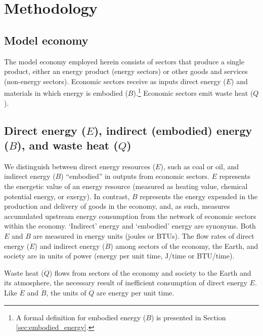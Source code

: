 \documentclass[authoryear,preprint,review,12pt]{elsarticle}
\begin{document}
\section{Methodology}

\subsection{Model economy}

The model economy employed herein consists of sectors that produce a single product, either an energy product (energy sectors) or other goods and services (non-energy sectors). Economic sectors receive as inputs direct energy ($E$) and materials in which energy is embodied ($B$).\footnote{A formal definition for embodied energy ($B$) is presented in Section \ref{sec:embodied_energy}.} Economic sectors emit waste heat ($Q$).

\subsection{Direct energy ($E$), indirect (embodied) energy ($B$), and waste heat ($Q$)}

We distinguish between direct energy resources ($E$), such as coal or oil, and indirect energy ($B$) ``embodied'' in outputs from economic sectors. $E$ represents the energetic value of an energy resource (measured as heating value, chemical potential energy, or exergy). In contrast, $B$ represents the energy expended in the production and delivery of goods in the economy, and, as such, measures accumulated upstream energy consumption from the network of economic sectors within the economy. `Indirect' energy and `embodied' energy are synonyms. Both $E$ and $B$ are measured in energy units (joules or BTUs). The flow rates of direct energy ($\dot{E}$) and indirect energy ($\dot{B}$) among sectors of the economy, the Earth, and society are in units of power (energy per unit time, J/time or BTU/time).

Waste heat ($\dot{Q}$) flows from sectors of the economy and society to the Earth and its atmosphere, the necessary result of inefficient consumption of direct energy $E$. Like $\dot{E}$ and $\dot{B}$, the units of $\dot{Q}$ are energy per unit time.
\end{document}
